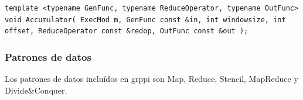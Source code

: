 \begin{itemize}
    \vspace{0.35cm}
    \begin{lstlisting}[frame=single,label={code:accum},caption={Interfaz Accumulator.}]
template <typename GenFunc, typename ReduceOperator, typename OutFunc>
void Accumulator( ExecMod m, GenFunc const &in, int windowsize, int offset, ReduceOperator const &redop, OutFunc const &out );
\end{lstlisting}
\vspace{0.35cm}
    
\end{itemize}

\subsubsection{Patrones de datos}

Los patrones de datos incluídos en \acrshort{grppi} son Map, Reduce, Stencil, MapReduce y Divide\&Conquer.

